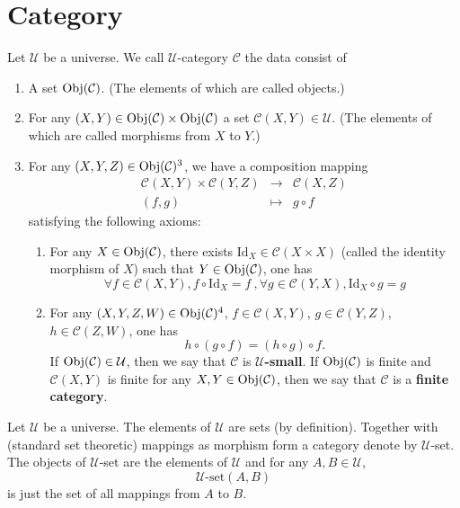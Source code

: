 \section{Category}
\begin{definitionenv}
    Let $\mathcal{U}$ be a universe. We call $\mathcal{U}$-category $\mathcal{C}$ the data consist of
    \begin{enumerate}[label=(\roman*)]
        \item A set $\operatorname{\mathrm{Obj}}(\mathcal{C})$. (The elements of which are called objects.)
        \item For any $(X,Y) \in \operatorname{\mathrm{Obj}}(\mathcal{C})\times \operatorname{\mathrm{Obj}}(\mathcal{C})$ a set $\mathcal{C}(X,Y)\in \mathcal{U}$. (The elements of which are called morphisms from $X$ to $Y$.)
        \item For any $(X,Y,Z)\in \operatorname{\mathrm{Obj}}(\mathcal{C})^3$, we have a composition mapping
$$
            \begin{array}{rcl}
            \mathcal{C}(X,Y)\times \mathcal{C}(Y,Z) &\rightarrow &\mathcal{C}(X,Z)\\ 
            (f,g)&\mapsto & g\circ f
            \end{array}
$$
            satisfying the following axioms:
            \begin{enumerate}[label=(\alph*)]
                \item For any $X\in \operatorname{\mathrm{Obj}}(\mathcal{C})$, there exists $\mathrm{Id}_X\in \mathcal{C}(X\times X)$ (called the identity morphism of $X$) such that $Y\in \operatorname{\mathrm{Obj}}(\mathcal{C})$, one has
                $$\forall f\in \mathcal{C}(X,Y), f\circ \mathrm{Id}_X = f\ ,\forall g\in \mathcal{C}(Y,X), \mathrm{Id}_X\circ g = g$$
                \item For any $(X,Y,Z,W)\in \operatorname{\mathrm{Obj}}(\mathcal{C})^4$, $f\in \mathcal{C}(X,Y)$, $g\in \mathcal{C}(Y,Z)$, $h\in \mathcal{C}(Z,W)$, one has $$ h\circ(g\circ f) = (h\circ g)\circ f.$$
                    If $\operatorname{\mathrm{Obj}}(\mathcal{C})\in \mathcal{U}$, then we say that $\mathcal{C}$ is \textbf{$\mathcal{U}$-small}. If $\operatorname{\mathrm{Obj}}(\mathcal{C})$ is finite and $\mathcal{C}(X,Y)$ is finite for any $X,Y\in \operatorname{\mathrm{Obj}}(\mathcal{C})$, then we say that $\mathcal{C}$ is a \textbf{finite category}.
            \end{enumerate}
    \end{enumerate}
\end{definitionenv}
\begin{exampleenv}
    Let $\mathcal{U}$ be a universe. The elements of $\mathcal{U}$ are sets (by definition). Together with (standard set theoretic) mappings as morphism form a category denote by $\mathcal{U}$-set. The objects of $\mathcal{U}$-set are the elements of $\mathcal{U}$ and for any $A,B\in \mathcal{U}$, 
    $$ \mathcal{U}\text{-}\mathrm{set}(A,B)$$
    is just the set of all mappings from $A$ to $B$.
\end{exampleenv}
